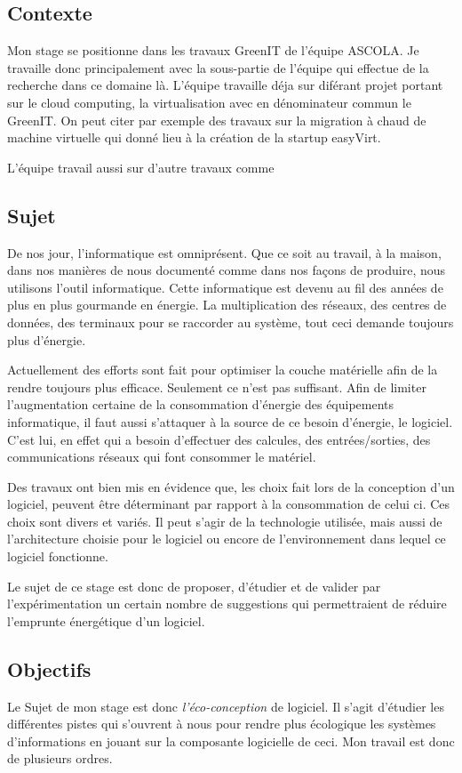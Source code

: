 \documentclass[a4paper, 11pt]{report}
\begin{document}
		\subsection{Contexte}
Mon stage se positionne dans les travaux GreenIT de l’équipe ASCOLA. Je travaille donc principalement avec la sous-partie de l'équipe qui effectue de la recherche dans ce domaine là. L'équipe travaille déja sur diférant projet portant sur le cloud computing, la virtualisation avec en dénominateur commun le GreenIT. On peut citer par exemple des travaux sur la migration à chaud de machine virtuelle qui donné lieu à la création de la startup easyVirt.

L'équipe travail aussi sur d'autre travaux comme %

		\subsection{Sujet}
De nos jour, l'informatique est omniprésent. Que ce soit au travail, à la maison, dans nos manières de nous documenté comme dans nos façons de produire, nous utilisons l'outil informatique. Cette informatique est devenu au fil des années de plus en plus gourmande en énergie. La multiplication des réseaux, des centres de données, des terminaux pour se raccorder au système, tout ceci demande toujours plus d'énergie.

Actuellement des efforts sont fait pour optimiser la couche matérielle afin de la rendre toujours plus efficace. Seulement ce n'est pas suffisant. Afin de limiter l'augmentation certaine de la consommation d'énergie des équipements informatique, il faut aussi s'attaquer à la source de ce besoin d'énergie, le logiciel. C'est lui, en effet qui a besoin d'effectuer des calcules, des entrées/sorties, des communications réseaux qui font consommer le matériel.

Des travaux ont bien mis en évidence que, les choix fait lors de la conception d'un logiciel, peuvent être déterminant par rapport à la consommation de celui ci. Ces choix sont divers et variés. Il peut s'agir de la technologie utilisée, mais aussi de l'architecture choisie pour le logiciel ou encore de l'environnement dans lequel ce logiciel fonctionne.

Le sujet de ce stage est donc de proposer, d'étudier et de valider par l'expérimentation un certain nombre de suggestions qui permettraient de réduire l'emprunte énergétique d'un logiciel.

		\subsection{Objectifs}
Le Sujet de mon stage est donc \textit{l'éco-conception} de logiciel. Il s'agit d'étudier les différentes pistes qui s'ouvrent à nous pour rendre plus écologique les systèmes d'informations en jouant sur la composante logicielle de ceci. Mon travail est donc de plusieurs ordres.
\end{document}
